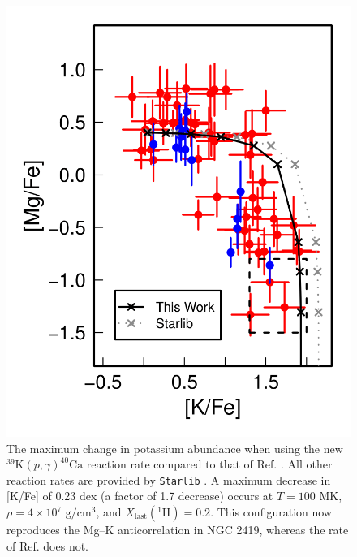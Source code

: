 \begin{figure}[!p]
\includegraphics[width=5.5in]{Chapter-6/figs/MaxKSeparation_T100_rho4d7_xlast20_HDA.png}
\caption{\label{fig:MaxSeparation}The maximum change in potassium abundance when using the new $^{39}\mathrm{K}(p,\gamma)^{40}\mathrm{Ca}$ reaction rate compared to that of Ref. \cite{Longland2018}. All other reaction rates are provided by \texttt{Starlib} \cite{Sallaska2013}. A maximum decrease in [K/Fe] of 0.23 dex (a factor of 1.7 decrease) occurs at $T = 100$ MK, $\rho = 4 \times 10^{7}$ $\mathrm{g}/\mathrm{cm}^{3}$, and $X_{\mathrm{last}}(^{1}\mathrm{H}) = 0.2$. This configuration now reproduces the Mg--K anticorrelation in NGC 2419, whereas the rate of Ref. \cite{Longland2018} does not.}
\end{figure}

